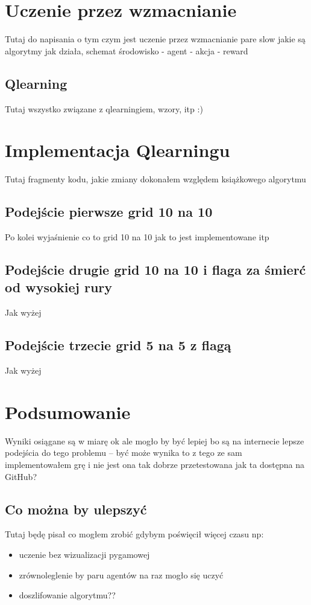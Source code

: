 \documentclass[a4paper,12pt,oneside]{book}
\begin{document}
\chapter{Uczenie przez wzmacnianie}
Tutaj do napisania o tym czym jest uczenie przez wzmacnianie pare slow jakie są algorytmy
jak działa, schemat środowisko - agent - akcja - reward
\section{Q\dywiz learning}
Tutaj wszystko związane z qlearningiem, wzory, itp :)

\chapter{Implementacja Q\dywiz learningu}
Tutaj fragmenty kodu, jakie zmiany dokonałem względem książkowego algorytmu
\section{Podejście pierwsze grid 10 na 10}
Po kolei wyjaśnienie co to grid 10 na 10 jak to jest implementowane itp
\section{Podejście drugie grid 10 na 10 i flaga za śmierć od wysokiej rury}
Jak wyżej
\section{Podejście trzecie grid 5 na 5 z flagą}
Jak wyżej

\chapter{Podsumowanie}
Wyniki osiągane są w miarę ok ale mogło by być lepiej bo są na internecie lepsze
podejścia do tego problemu -- być może wynika to z tego ze sam implementowałem grę
i nie jest ona tak dobrze przetestowana jak ta dostępna na GitHub?
\section{Co można by ulepszyć}
Tutaj będę pisał co mogłem zrobić gdybym poświęcił więcej czasu np:
\begin{itemize}
\item uczenie bez wizualizacji pygamowej
\item zrównoleglenie by paru agentów na raz mogło się uczyć
\item doszlifowanie algorytmu??
\end{itemize}




\end{document}
